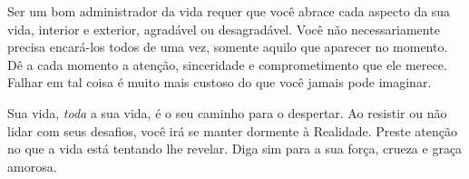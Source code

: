 Ser um bom administrador da vida requer que você abrace cada aspecto da sua vida, interior e exterior, agradável ou desagradável. Você não necessariamente precisa encará-los todos de uma vez, somente aquilo que aparecer no momento. Dê a cada momento a atenção, sinceridade e comprometimento que ele merece. Falhar em tal coisa é muito mais custoso do que você jamais pode imaginar. 

Sua vida, \emph{toda} a sua vida, é o seu caminho para o despertar. Ao resistir ou não lidar com seus desafios, você irá se manter dormente à Realidade. Preste atenção no que a vida está tentando lhe revelar. Diga sim para a sua força, crueza e graça amorosa.
